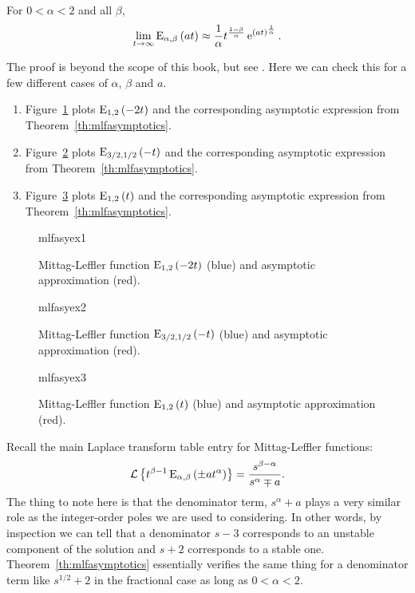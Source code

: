 \begin{theorem}
  For $0 < \alpha < 2$ and all $\beta$, 
  \begin{equation*}
    \lim_{ t \rightarrow \infty} \operatorname{E}_{\alpha,\beta} \left( a t \right) \approx \frac{1}{\alpha} t^{\frac{1-\beta}{\alpha}}\operatorname{e}^{\left( a t \right)^\frac{1}{\alpha}}.
  \end{equation*}
  \label{th:mlfasymptotics}
\end{theorem}

The proof is beyond the scope of this book, but see \cite{fraccontrol,mlfbook}. Here we can check this for a few different cases of $\alpha$, $\beta$ and $a$.

\begin{example}
  \begin{enumerate}
    \item Figure~\ref{fig:mlfasyex1} plots $\operatorname{E}_{1,2}\left(-2 t \right)$ and the corresponding asymptotic expression from Theorem~\ref{th:mlfasymptotics}. 
    \item Figure~\ref{fig:mlfasyex2} plots $\operatorname{E}_{3/2,1/2}\left(-t \right)$ and the corresponding asymptotic expression from Theorem~\ref{th:mlfasymptotics}. 
    \item Figure~\ref{fig:mlfasyex3} plots $\operatorname{E}_{1,2}\left(t \right)$ and the corresponding asymptotic expression from Theorem~\ref{th:mlfasymptotics}. 
  \end{enumerate} 
\end{example}

\begin{figure}  
  \centering
  {mlfasyex1}
  \caption{Mittag-Leffler function $\operatorname{E}_{1,2}\left(-2 t\right)$ (blue) and asymptotic approximation (red).}
  \label{fig:mlfasyex1}
\end{figure}

\begin{figure}  
  \centering
  {mlfasyex2}
  \caption{Mittag-Leffler function $\operatorname{E}_{3/2,1/2}\left(-t\right)$ (blue) and asymptotic approximation (red).}
  \label{fig:mlfasyex2}
\end{figure}

\begin{figure}  
  \centering
  {mlfasyex3}
  \caption{Mittag-Leffler function $\operatorname{E}_{1,2}\left(t\right)$ (blue) and asymptotic approximation (red).}
  \label{fig:mlfasyex3}
\end{figure}

Recall the main Laplace transform table entry for Mittag-Leffler functions:
\begin{equation*}
  \mathcal L \left\{ t^{\beta - 1} \operatorname{E}_{\alpha,\beta} \left( \pm a t^\alpha \right) \right\} = \frac{s^{\beta-\alpha}}{s^\alpha \mp a}.
\end{equation*}
The thing to note here is that the denominator term, $s^\alpha + a$ plays a very similar role as the integer-order poles we are used to considering. In other words, by inspection we can tell that a denominator $s-3$ corresponds to an unstable component of the solution and $s+2$ corresponds to a stable one. Theorem~\ref{th:mlfasymptotics} essentially verifies the same thing for a denominator term like $s^{1/2}+2$ in the fractional case as long as $0 < \alpha < 2$.

